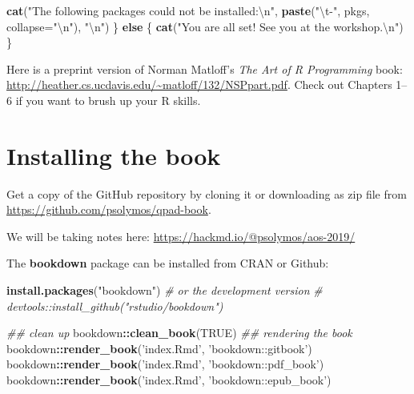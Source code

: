 \documentclass[12pt,]{book}
\newenvironment{Shaded}{\begin{snugshade}}{\end{snugshade}}
\newcommand{\CharTok}[1]{\textcolor[rgb]{0.31,0.60,0.02}{#1}}
\newcommand{\CommentTok}[1]{\textcolor[rgb]{0.56,0.35,0.01}{\textit{#1}}}
\newcommand{\ControlFlowTok}[1]{\textcolor[rgb]{0.13,0.29,0.53}{\textbf{#1}}}
\newcommand{\DataTypeTok}[1]{\textcolor[rgb]{0.13,0.29,0.53}{#1}}
\newcommand{\KeywordTok}[1]{\textcolor[rgb]{0.13,0.29,0.53}{\textbf{#1}}}
\newcommand{\NormalTok}[1]{#1}
\newcommand{\OperatorTok}[1]{\textcolor[rgb]{0.81,0.36,0.00}{\textbf{#1}}}
\newcommand{\OtherTok}[1]{\textcolor[rgb]{0.56,0.35,0.01}{#1}}
\newcommand{\StringTok}[1]{\textcolor[rgb]{0.31,0.60,0.02}{#1}}
\begin{document}
\begin{Shaded}
\begin{Highlighting}[]
  \KeywordTok{cat}\NormalTok{(}\StringTok{"The following packages could not be installed:}\CharTok{\textbackslash{}n}\StringTok{"}\NormalTok{,}
    \KeywordTok{paste}\NormalTok{(}\StringTok{"}\CharTok{\textbackslash{}t}\StringTok{-"}\NormalTok{, pkgs, }\DataTypeTok{collapse=}\StringTok{"}\CharTok{\textbackslash{}n}\StringTok{"}\NormalTok{), }\StringTok{"}\CharTok{\textbackslash{}n}\StringTok{"}\NormalTok{)}
\NormalTok{\} }\ControlFlowTok{else}\NormalTok{ \{}
  \KeywordTok{cat}\NormalTok{(}\StringTok{"You are all set! See you at the workshop.}\CharTok{\textbackslash{}n}\StringTok{"}\NormalTok{)}
\NormalTok{\}}
\end{Highlighting}
\end{Shaded}

Here is a preprint version of Norman Matloff's \emph{The Art of R Programming} book: \url{http://heather.cs.ucdavis.edu/~matloff/132/NSPpart.pdf}.
Check out Chapters 1--6 if you want to brush up your R skills.

\hypertarget{installing-the-book}{%
\section*{Installing the book}\label{installing-the-book}}

Get a copy of the GitHub repository by cloning it or downloading
as zip file from \url{https://github.com/psolymos/qpad-book}.

We will be taking notes here:
\url{https://hackmd.io/@psolymos/aos-2019/}

The \textbf{bookdown} package can be installed from CRAN or Github:

\begin{Shaded}
\begin{Highlighting}[]
\KeywordTok{install.packages}\NormalTok{(}\StringTok{"bookdown"}\NormalTok{)}
\CommentTok{# or the development version}
\CommentTok{# devtools::install_github("rstudio/bookdown")}

\CommentTok{## clean up }
\NormalTok{bookdown}\OperatorTok{::}\KeywordTok{clean_book}\NormalTok{(}\OtherTok{TRUE}\NormalTok{)}
\CommentTok{## rendering the book}
\NormalTok{bookdown}\OperatorTok{::}\KeywordTok{render_book}\NormalTok{(}\StringTok{'index.Rmd'}\NormalTok{, }\StringTok{'bookdown::gitbook'}\NormalTok{)}
\NormalTok{bookdown}\OperatorTok{::}\KeywordTok{render_book}\NormalTok{(}\StringTok{'index.Rmd'}\NormalTok{, }\StringTok{'bookdown::pdf_book'}\NormalTok{)}
\NormalTok{bookdown}\OperatorTok{::}\KeywordTok{render_book}\NormalTok{(}\StringTok{'index.Rmd'}\NormalTok{, }\StringTok{'bookdown::epub_book'}\NormalTok{)}
\end{Highlighting}
\end{Shaded}
\end{document}
